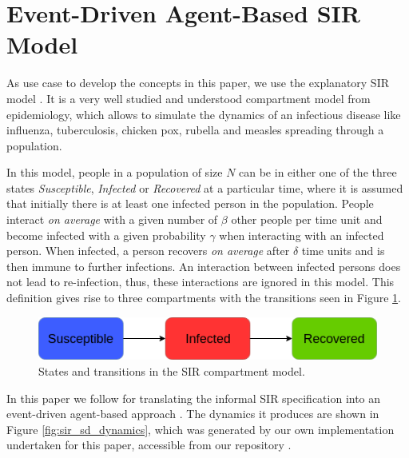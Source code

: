 \section{Event-Driven Agent-Based SIR Model}
\label{sec:sirmodel}
As use case to develop the concepts in this paper, we use the explanatory SIR model \cite{kermack_contribution_1927}. It is a very well studied and understood compartment model from epidemiology, which allows to simulate the dynamics of an infectious disease like influenza, tuberculosis, chicken pox, rubella and measles spreading through a population. 

In this model, people in a population of size $N$ can be in either one of the three states \textit{Susceptible}, \textit{Infected} or \textit{Recovered} at a particular time, where it is assumed that initially there is at least one infected person in the population. People interact \textit{on average} with a given number of $\beta$ other people per time unit and become infected with a given probability $\gamma$ when interacting with an infected person. When infected, a person recovers \textit{on average} after $\delta$ time units and is then immune to further infections. An interaction between infected persons does not lead to re-infection, thus, these interactions are ignored in this model. This definition gives rise to three compartments with the transitions seen in Figure \ref{fig:sir_transitions}.

\begin{figure}
	\centering
	\includegraphics[width=.5\textwidth, angle=0]{./fig1.png}
	\caption{States and transitions in the SIR compartment model.}
	\label{fig:sir_transitions}
\end{figure}

In this paper we follow \cite{macal_agent-based_2010} for translating the informal SIR specification into an event-driven agent-based approach \cite{meyer_event-driven_2014}. The dynamics it produces are shown in Figure \ref{fig:sir_sd_dynamics}, which was generated by our own implementation undertaken for this paper, accessible from our repository \cite{thaler_repository_2019}.

